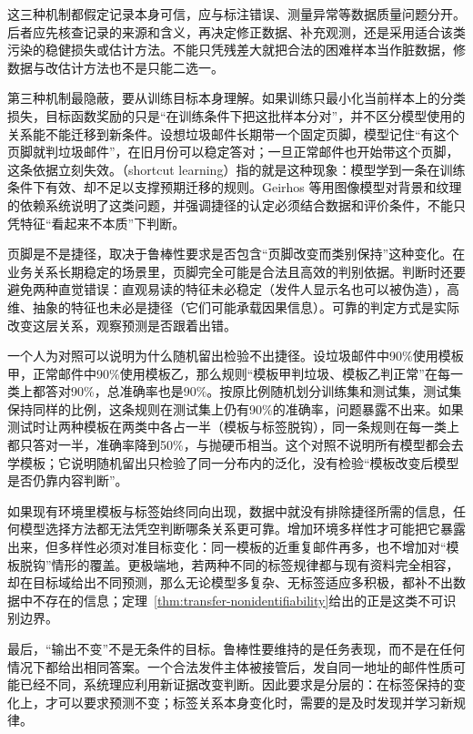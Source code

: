 这三种机制都假定记录本身可信，应与标注错误、测量异常等数据质量问题分开。后者应先核查记录的来源和含义，再决定修正数据、补充观测，还是采用适合该类污染的稳健损失或估计方法。不能只凭残差大就把合法的困难样本当作脏数据，修数据与改估计方法也不是只能二选一。

第三种机制最隐蔽，要从训练目标本身理解。如果训练只最小化当前样本上的分类损失，目标函数奖励的只是“在训练条件下把这批样本分对”，并不区分模型使用的关系能不能迁移到新条件。设想垃圾邮件长期带一个固定页脚，模型记住“有这个页脚就判垃圾邮件”，在旧月份可以稳定答对；一旦正常邮件也开始带这个页脚，这条依据立刻失效。（shortcut learning）指的就是这种现象：模型学到一条在训练条件下有效、却不足以支撑预期迁移的规则。Geirhos 等用图像模型对背景和纹理的依赖系统说明了这类问题，并强调捷径的认定必须结合数据和评价条件，不能只凭特征“看起来不本质”下判断。

页脚是不是捷径，取决于鲁棒性要求是否包含“页脚改变而类别保持”这种变化。在业务关系长期稳定的场景里，页脚完全可能是合法且高效的判别依据。判断时还要避免两种直觉错误：直观易读的特征未必稳定（发件人显示名也可以被伪造），高维、抽象的特征也未必是捷径（它们可能承载因果信息）。可靠的判定方式是实际改变这层关系，观察预测是否跟着出错。

一个人为对照可以说明为什么随机留出检验不出捷径。设垃圾邮件中90\%使用模板甲，正常邮件中90\%使用模板乙，那么规则“模板甲判垃圾、模板乙判正常”在每一类上都答对90\%，总准确率也是90\%。按原比例随机划分训练集和测试集，测试集保持同样的比例，这条规则在测试集上仍有90\%的准确率，问题暴露不出来。如果测试时让两种模板在两类中各占一半（模板与标签脱钩），同一条规则在每一类上都只答对一半，准确率降到50\%，与抛硬币相当。这个对照不说明所有模型都会去学模板；它说明随机留出只检验了同一分布内的泛化，没有检验“模板改变后模型是否仍靠内容判断”。

如果现有环境里模板与标签始终同向出现，数据中就没有排除捷径所需的信息，任何模型选择方法都无法凭空判断哪条关系更可靠。增加环境多样性才可能把它暴露出来，但多样性必须对准目标变化：同一模板的近重复邮件再多，也不增加对“模板脱钩”情形的覆盖。更极端地，若两种不同的标签规律都与现有资料完全相容，却在目标域给出不同预测，那么无论模型多复杂、无标签适应多积极，都补不出数据中不存在的信息；定理~\ref{thm:transfer-nonidentifiability}给出的正是这类不可识别边界。

最后，“输出不变”不是无条件的目标。鲁棒性要维持的是任务表现，而不是在任何情况下都给出相同答案。一个合法发件主体被接管后，发自同一地址的邮件性质可能已经不同，系统理应利用新证据改变判断。因此要求是分层的：在标签保持的变化上，才可以要求预测不变；标签关系本身变化时，需要的是及时发现并学习新规律。

